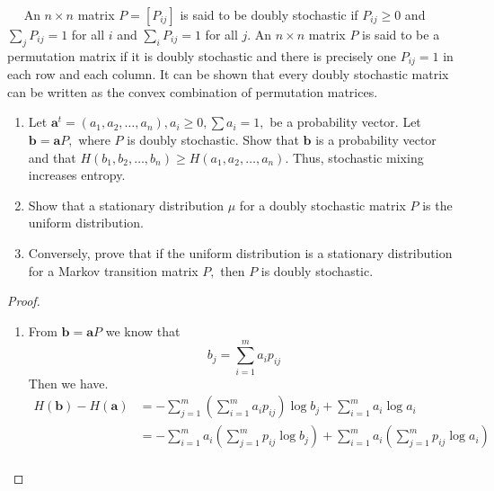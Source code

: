 \begin{exercise}{$\quad$ An $n \times n$ matrix $P=\left[P_{i j}\right]$ is said to be doubly stochastic if $P_{i j} \geq 0$ and $\sum_{j} P_{i j}=1$ for all $i$ and $\sum_{i} P_{i j}=1$ for all $j .$ An $n \times n$ matrix $P$ is said to be a permutation matrix if it is doubly stochastic and there is precisely one $P_{i j}=1$ in each row and each column. It can be shown that every doubly stochastic matrix can be written as the convex combination of permutation matrices.
  \begin{enumerate}
    \item Let $\mathbf{a}^{t}=\left(a_{1}, a_{2}, \ldots, a_{n}\right), a_{i} \geq 0, \sum a_{i}=1,$ be a probability vector. Let $\mathbf{b}=\mathbf{a} P,$ where $P$ is doubly stochastic. Show that $\mathbf{b}$ is a probability vector and that $H\left(b_{1}, b_{2}, \ldots, b_{n}\right) \geq H\left(a_{1}, a_{2}, \ldots, a_{n} \right)$. Thus, stochastic mixing increases entropy.
    \item Show that a stationary distribution $\mu$ for a doubly stochastic matrix $P$ is the uniform distribution.
    \item Conversely, prove that if the uniform distribution is a stationary distribution for a Markov transition matrix $P,$ then $P$ is doubly stochastic.
  \end{enumerate}}
  \begin{proof}
  \par{~}
  \begin{enumerate}
    \item {
      From $\mathbf{b} = \mathbf{a}P$ we know that
      \begin{equation}
        b_j = \sum_{i=1}^{m} a_i p_{ij}
      \end{equation}
      Then we have.
      \begin{equation}
        \begin{aligned}
          H(\mathbf{b}) - H(\mathbf{a}) &= - \sum_{j=1}^{m} \left(\sum_{i=1}^{m} a_i p_{ij}\right) \log  b_j + \sum_{i=1}^{m} a_i \log a_i \\
          &= - \sum_{i=1}^{m} a_i \left(\sum_{j=1}^{m} p_{ij}\log  b_j \right)+ \sum_{i=1}^{m} a_i \left(\sum_{j=1}^{m} p_{ij} \log a_i \right) \\

\end{aligned}
\end{equation}}
\end{enumerate}
\end{proof}
\end{exercise}
